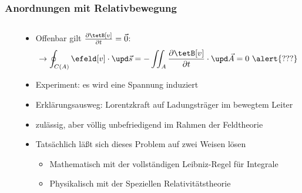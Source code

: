 \begin{frame}
  \frametitle{Anordnungen mit Relativbewegung}
  \begin{columns}
    \begin{column}{.4\textwidth}
  \resizebox{\columnwidth}{!}{}
    \end{column}
    \begin{column}{.6\textwidth}
  \begin{itemize}[<+->]
  \item Offenbar gilt $\frac{\partial \tetB[v]}{\partial t} = \vec{0}$:
    $$
    \to \oint_{C(A)} \efeld[v]\cdot\upd\vec{s} = -\iint_{A} \frac{\partial \tetB[v]}{\partial t} \cdot \upd \vec{A} = 0 \text{ \alert{???}}
    $$
  \item Experiment: \alert{es wird eine Spannung induziert}
  \item Erklärungsausweg: \alert{Lorentzkraft} auf Ladungsträger im bewegtem Leiter
  \item zulässig, aber völlig \alert{unbefriedigend} im Rahmen der Feldtheorie
  \item Tatsächlich läßt sich dieses Problem auf zwei Weisen lösen
    \begin{itemize}[<+->]
    \item \alert{Mathematisch} mit der vollständigen \alert{Leibniz-Regel für Integrale}
     \item \alert{Physikalisch} mit der \alert{Speziellen Relativitätstheorie}
      \end{itemize}
  \end{itemize}
      \end{column}
    \end{columns}
\end{frame}

